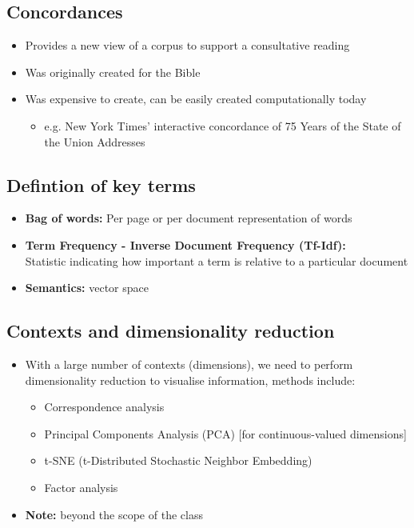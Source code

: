 \documentclass[a4paper]{article}
\begin{document}
\subsection{Concordances}
\begin{itemize}
    \item Provides a new view of a corpus to support a consultative reading
    \item Was originally created for the Bible
    \item Was expensive to create, can be easily created computationally today
    \begin{itemize}[label=$\circ$]
        \item e.g. New York Times' interactive concordance of 75 Years of the State of the Union Addresses
    \end{itemize}
\end{itemize}
\subsection{Defintion of key terms}
\begin{itemize}
    \item \textbf{Bag of words:} Per page or per document representation of words
\item \textbf{Term Frequency - Inverse Document Frequency (Tf-Idf):}\\Statistic indicating how important a term is relative to a particular document
\item \textbf{Semantics: }vector space
\end{itemize}
\subsection{Contexts and dimensionality reduction}
\begin{itemize}
    \item With a large number of contexts (dimensions), we need to perform dimensionality reduction to visualise information, methods include:
    \begin{itemize}[label=$\circ$]
        \item Correspondence analysis
        \item Principal Components Analysis (PCA) [for continuous-valued dimensions]
        \item t-SNE (t-Distributed Stochastic Neighbor Embedding)
        \item Factor analysis
    \end{itemize}
    \item \textbf{Note:} beyond the scope of the class
\end{itemize}
\end{document}
